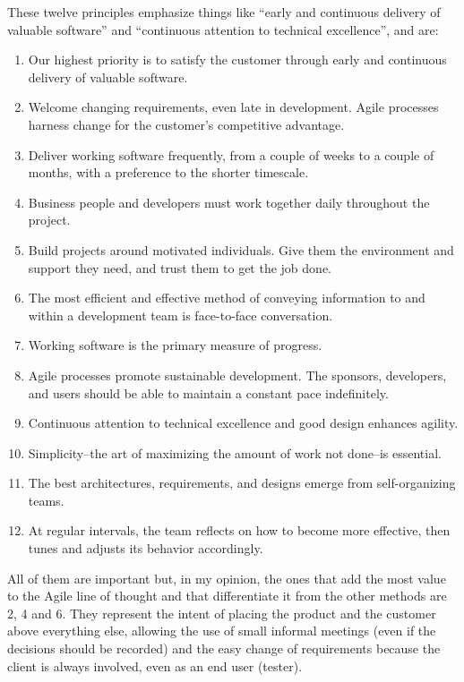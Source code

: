 	These twelve principles emphasize things like “early and continuous delivery of valuable software” and “continuous attention to technical excellence”, and are: %
	\begin{enumerate}
		\item Our highest priority is to satisfy the customer through early and continuous delivery of valuable software.
		\item Welcome changing requirements, even late in development. Agile processes harness change for the customer's competitive advantage.
		\item Deliver working software frequently, from a couple of weeks to a couple of months, with a preference to the shorter timescale.
		\item Business people and developers must work together daily throughout the project.	
		\item Build projects around motivated individuals. Give them the environment and support they need, and trust them to get the job done.
		\item The most efficient and effective method of conveying information to and within a development team is face-to-face conversation.
		\item Working software is the primary measure of progress.
		\item Agile processes promote sustainable development. The sponsors, developers, and users should be able to maintain a constant pace indefinitely.	
		\item Continuous attention to technical excellence and good design enhances agility.
		\item Simplicity--the art of maximizing the amount of work not done--is essential.
		\item The best architectures, requirements, and designs emerge from self-organizing teams.
		\item At regular intervals, the team reflects on how to become more effective, then tunes and adjusts its behavior accordingly.
	\end{enumerate}
	
	All of them are important but, in my opinion, the ones that add the most value to the Agile line of thought and that differentiate it from the other methods are 2, 4 and 6.
	They represent the intent of placing the product and the customer above everything else, allowing the use of small informal meetings (even if the decisions should be recorded) and the easy change of requirements because the client is always involved, even as an end user (tester). 

